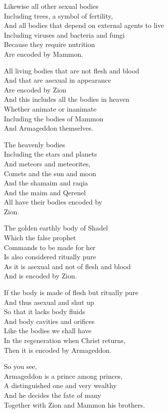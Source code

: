 \documentclass[
]{book}
\begin{document}
Likewise all other sexual bodies\\
Including trees, a symbol of fertility,\\
And all bodies that depend on external agents to live\\
Including viruses and bacteria and fungi\\
Because they require nutrition\\
Are encoded by Mammon.

All living bodies that are not flesh and blood\\
And that are asexual in appearance\\
Are encoded by Zion\\
And this includes all the bodies in heaven\\
Whether animate or inanimate\\
Including the bodies of Mammon\\
And Armageddon themselves.

The heavenly bodies\\
Including the stars and planets\\
And meteors and meteorites,\\
Comets and the sun and moon\\
And the shamaim and raqia\\
And the maim and Qerenel\\
All have their bodies encoded by\\
Zion.

The golden earthly body of Shadel\\
Which the false prophet\\
Commands to be made for her\\
Is also considered ritually pure\\
As it is asexual and not of flesh and blood\\
And is encoded by Zion.

If the body is made of flesh but ritually pure\\
And thus asexual and shut up\\
So that it lacks body fluids\\
And body cavities and orifices\\
Like the bodies we shall have\\
In the regeneration when Christ returns,\\
Then it is encoded by Armageddon.

So you see,\\
Armageddon is a prince among princes,\\
A distinguished one and very wealthy\\
And he decides the fate of many\\
Together with Zion and Mammon his brothers.
\end{document}
